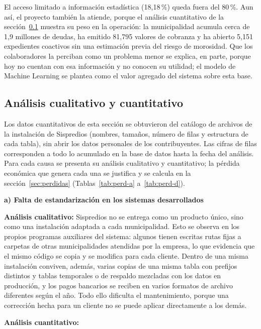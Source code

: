 \documentclass[12pt,a4paper]{report}
\newcommand{\subtitulo}[1]{\par\vspace{4pt}\noindent\textbf{#1}\par}
\begin{document}
El acceso limitado a información estadística (18,18\,\%) queda fuera del 80\,\%. Aun así, el proyecto también la atiende, porque el análisis cuantitativo de la sección~\ref{sec:analisis-cuali-cuanti} muestra su peso en la operación: la municipalidad acumula cerca de 1,9 millones de deudas, ha emitido 81,795 valores de cobranza y ha abierto 5,151 expedientes coactivos sin una estimación previa del riesgo de morosidad. Que los colaboradores la perciban como un problema menor se explica, en parte, porque hoy no cuentan con esa información y no conocen su utilidad; el modelo de Machine Learning se plantea como el valor agregado del sistema sobre esta base.

\subsection{Análisis cualitativo y cuantitativo}
\label{sec:analisis-cuali-cuanti}

Los datos cuantitativos de esta sección se obtuvieron del catálogo de archivos de la instalación de Sispredios (nombres, tamaños, número de filas y estructura de cada tabla), sin abrir los datos personales de los contribuyentes. Las cifras de filas corresponden a todo lo acumulado en la base de datos hasta la fecha del análisis. Para cada causa se presenta su análisis cualitativo y cuantitativo; la pérdida económica que genera cada una se justifica y se calcula en la sección~\ref{sec:perdidas} (Tablas~\ref{tab:perd-a} a~\ref{tab:perd-d}).

\subtitulo{a) Falta de estandarización en los sistemas desarrollados}

\noindent\textbf{Análisis cualitativo:} Sispredios no se entrega como un producto único, sino como una instalación adaptada a cada municipalidad. Esto se observa en los propios programas auxiliares del sistema: algunos tienen escritas rutas fijas a carpetas de otras municipalidades atendidas por la empresa, lo que evidencia que el mismo código se copia y se modifica para cada cliente. Dentro de una misma instalación conviven, además, varias copias de una misma tabla con prefijos distintos y tablas temporales o de respaldo mezcladas con los datos en producción, y los pagos bancarios se reciben en varios formatos de archivo diferentes según el año. Todo ello dificulta el mantenimiento, porque una corrección hecha para un cliente no se puede aplicar directamente a los demás.

\noindent\textbf{Análisis cuantitativo:}
\end{document}
